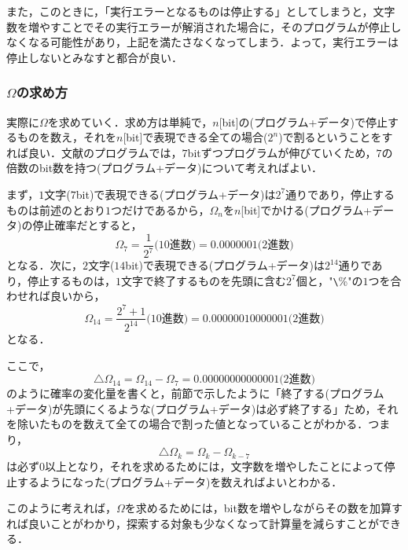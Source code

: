 \documentclass{jarticle}
\begin{document}
また，このときに，「実行エラーとなるものは停止する」としてしまうと，文字数を増やすことでその実行エラーが解消された場合に，そのプログラムが停止しなくなる可能性があり，上記を満たさなくなってしまう．よって，実行エラーは停止しないとみなすと都合が良い．

\subsubsection{$\Omega$の求め方}
実際に$\Omega$を求めていく．求め方は単純で，$n$[bit]の(プログラム+データ)で停止するものを数え，それを$n$[bit]で表現できる全ての場合($2^n$)で割るということをすれば良い．文献のプログラムでは，$7$bitずつプログラムが伸びていくため，$7$の倍数のbit数を持つ(プログラム+データ)について考えればよい．

まず，$1$文字($7$bit)で表現できる(プログラム+データ)は$2^7$通りであり，停止するものは前述のとおり$1$つだけであるから，$\Omega_n$を$n$[bit]でかける(プログラム+データ)の停止確率だとすると，
\begin{equation}
	\Omega_7 = \frac{1}{2^7} \text{(10進数)} =  0.0000001 \text{(2進数)}
\end{equation}
となる．次に，$2$文字($14$bit)で表現できる(プログラム+データ)は$2^{14}$通りであり，停止するものは，$1$文字で終了するものを先頭に含む$2^7$個と，"\verb+\+\%"の$1$つを合わせれば良いから，
\begin{equation}
	\Omega_{14} = \frac{2^7 + 1}{2^{14}} \text{(10進数)} =  0.00000010000001 \text{(2進数)}
\end{equation}
となる．

ここで，
\begin{equation}
	\triangle \Omega_{14} = \Omega_{14} - \Omega_{7} = 0.00000000000001\text{(2進数)}
\end{equation}
のように確率の変化量を書くと，前節で示したように「終了する(プログラム+データ)が先頭にくるような(プログラム+データ)は必ず終了する」ため，それを除いたものを数えて全ての場合で割った値となっていることがわかる．つまり，
\begin{equation}
	\triangle \Omega_{k} = \Omega_{k} - \Omega_{k-7}
\end{equation}
は必ず$0$以上となり，それを求めるためには，文字数を増やしたことによって停止するようになった(プログラム+データ)を数えればよいとわかる．

このように考えれば，$\Omega$を求めるためには，bit数を増やしながらその数を加算すれば良いことがわかり，探索する対象も少なくなって計算量を減らすことができる．
\end{document}
